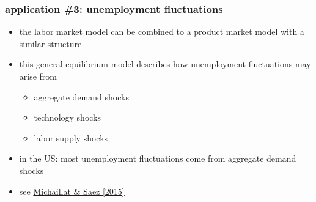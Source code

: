 \documentclass[12pt,xcolor={dvipsnames},hyperref={pdftex,pdfpagemode=UseNone,hidelinks,pdfdisplaydoctitle=true},usepdftitle=false]{beamer}
\begin{document}
\begin{frame}
\frametitle{application \#3: unemployment fluctuations}
 \begin{itemize}
\item the labor market model can be combined to a product market model with a similar structure
\item this general-equilibrium model describes how unemployment fluctuations may arise from
\begin{itemize}
\item aggregate demand shocks
\item technology shocks
\item labor supply shocks
\end{itemize} 
\item in the US: most unemployment fluctuations come from aggregate demand shocks
\item see \href{https://www.pascalmichaillat.org/3.html}{Michaillat \& Saez [2015]}
\end{itemize}
\end{frame}
\end{document}
